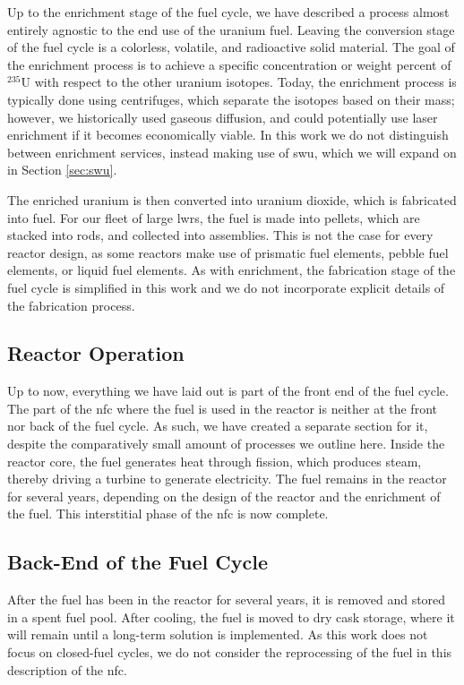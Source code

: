 Up to the enrichment stage of the fuel cycle, we have described a process
almost entirely agnostic to the end use of the uranium fuel. Leaving the
conversion stage of the fuel cycle is a colorless, volatile, and radioactive
solid material. The goal of the enrichment process is to achieve a specific
concentration or weight percent of $^{235}$U with respect to the other uranium
isotopes. Today, the enrichment process is typically done using centrifuges,
which separate the isotopes based on their mass; however, we historically used
gaseous diffusion, and could potentially use laser enrichment if it becomes
economically viable. In this work we do not distinguish between enrichment
services, instead making use of \gls{swu}, which we will expand on in Section
\ref{sec:swu}.

The enriched uranium is then converted into uranium dioxide, which is
fabricated into fuel. For our fleet of large \glspl{lwr}, the fuel is made into
pellets, which are stacked into rods, and collected into assemblies. This is
not the case for every reactor design, as some reactors make use of prismatic
fuel elements, pebble fuel elements, or liquid fuel elements. As with
enrichment, the fabrication stage of the fuel cycle is simplified in this work
and we do not incorporate explicit details of the fabrication process.

\subsection{Reactor Operation}
\label{sec:reactor_operation}
Up to now, everything we have laid out is part of the front end of the fuel
cycle. The part of the \gls{nfc} where the fuel is used in the reactor is
neither at the front nor back of the fuel cycle. As such, we have created a
separate section for it, despite the comparatively small amount of processes we
outline here. Inside the reactor core, the fuel generates heat through fission,
which produces steam, thereby driving a turbine to generate electricity. The
fuel remains in the reactor for several years, depending on the design of the
reactor and the enrichment of the fuel. This interstitial phase of the
\gls{nfc} is now complete.


\subsection{Back-End of the Fuel Cycle}
\label{sec:back_end}
After the fuel has been in the reactor for several years, it is removed and
stored in a spent fuel pool. After cooling, the fuel is moved to dry cask
storage, where it will remain until a long-term solution is implemented. As
this work does not focus on closed-fuel cycles, we do not consider the
reprocessing of the fuel in this description of the \gls{nfc}.

